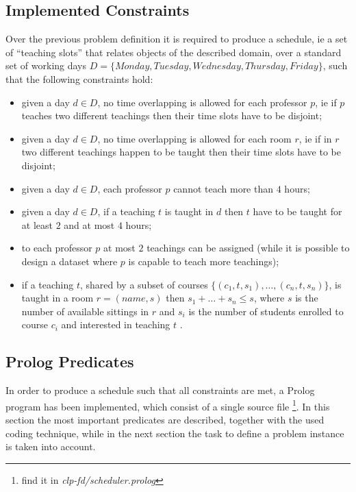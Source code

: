\documentclass[10pt,a4paper]{article} %
\begin{document}
    \subsection{Implemented Constraints}
    Over the previous problem definition it is required to produce a
    schedule, ie a set of ``teaching slots'' that relates
    objects of the described domain, over a standard set of
    working days $D = \lbrace Monday, Tuesday, Wednesday, Thursday, Friday \rbrace$,
    such that the following constraints hold:
    \begin{itemize}
        \item given a day $d \in D$, no time overlapping is allowed
            for each professor $p$,
            ie if $p$ teaches two different teachings then their time slots
            have to be disjoint;
        \item given a day $d \in D$, no time overlapping is allowed
            for each room $r$,
            ie if in $r$ two different teachings happen to be taught then
            their time slots have to be disjoint;
        \item given a day $d \in D$, each professor $p$ cannot teach more than
           $4$ hours;
        \item given a day $d \in D$, if a teaching $t$ is taught in $d$ then
            $t$ have to be taught for at least $2$ and at most $4$ hours;
        \item to each professor $p$ at most $2$ teachings can be assigned
            (while it is possible to design a dataset where $p$ is capable
            to teach more teachings);
        \item if a teaching $t$, shared by a subset of courses
            $\lbrace (c_1, t, s_1), \ldots, (c_n, t, s_n)\rbrace$,
            is taught in a room $r = (name, s)$ then $s_1 + \ldots + s_n \leq s$,
            where $s$ is the number of available sittings in $r$ and
            $s_i$ is the number of students enrolled
            to course $c_i$ and interested in teaching $t$ .
    \end{itemize}

    \subsection{Prolog Predicates}
    In order to produce a schedule such that all constraints are met,
    a Prolog program has been implemented, which consist of a single source file
    \footnote{ find it in \emph{clp-fd/scheduler.prolog}}. In this section the most
    important predicates are described, together with the used coding technique,
    while in the next section the task to define a problem instance is taken into
    account.
\end{document}
